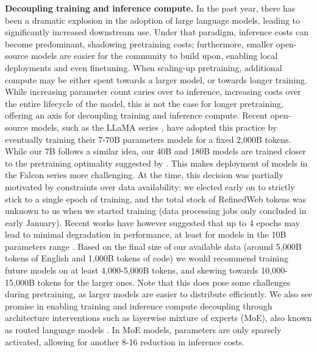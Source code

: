 \documentclass{article}
\begin{document}
\textbf{Decoupling training and inference compute.} In the past year, there has been a dramatic explosion in the adoption of large language models, leading to significantly increased downstream use. Under that paradigm, inference costs can become predominant, shadowing pretraining costs; furthermore, smaller open-source models are easier for the community to build upon, enabling local deployments and even finetuning. When scaling-up pretraining, additional compute may be either spent towards a larger model, or towards longer training. While increasing parameter count caries over to inference, increasing costs over the entire lifecycle of the model, this is not the case for longer pretraining, offering an axis for decoupling training and inference compute. Recent open-source models, such as the LLaMA series \citep{llama, llama2}, have adopted this practice by eventually training their 7-70B parameters models for a fixed 2,000B tokens. While our 7B follows a similar idea, our 40B and 180B models are trained closer to the pretraining optimality suggested by \citet{hoffmann2022training}. This makes deployment of models in the Falcon series more challenging. At the time, this decision was partially motivated by constraints over data availability: we elected early on to strictly stick to a single epoch of training, and the total stock of RefinedWeb tokens was unknown to us when we started training (data processing jobs only concluded in early January). Recent works have however suggested that up to 4 epochs may lead to minimal degradation in performance, at least for models in the 10B parameters range \citep{token_crisis, data_constrained}. Based on the final size of our available data (around 5,000B tokens of English and 1,000B tokens of code) we would recommend training future models on at least 4,000-5,000B tokens, and skewing towards 10,000-15,000B tokens for the larger ones. Note that this does pose some challenges during pretraining, as larger models are easier to distribute efficiently. We also see promise in enabling training and inference compute decoupling through architecture interventions such as layerwise mixture of experts (MoE), also known as routed language models \citep{clark2022unified, fedus2022switch}. In MoE models, parameters are only sparsely activated, allowing for another 8-16 reduction in inference costs. 
\end{document}

